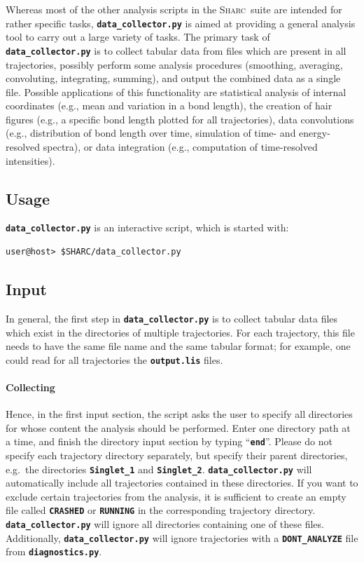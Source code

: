 \documentclass[a4paper,10pt,DIV=15,openany]{scrbook}
\newcommand{\sharc}{\textsc{Sharc}}
\newcommand{\ttt}[1]{\textbf{\texttt{#1}}}
\begin{document}
Whereas most of the other analysis scripts in the \sharc\ suite are intended for rather specific tasks, \ttt{data\_collector.py} is aimed at providing a general analysis tool to carry out a large variety of tasks.
The primary task of \ttt{data\_collector.py} is to collect tabular data from files which are present in all trajectories, possibly perform some analysis procedures (smoothing, averaging, convoluting, integrating, summing), and output the combined data as a single file.
Possible applications of this functionality are statistical analysis of internal coordinates (e.g., mean and variation in a bond length), the creation of hair figures (e.g., a specific bond length plotted for all trajectories), data convolutions (e.g., distribution of bond length over time, simulation of time- and energy-resolved spectra), or data integration (e.g., computation of time-resolved intensities).

\subsection{Usage}

\ttt{data\_collector.py} is an interactive script, which is started with:
\begin{verbatim}
user@host> $SHARC/data_collector.py
\end{verbatim}

\subsection{Input}

In general, the first step in \ttt{data\_collector.py} is to collect tabular data files which exist in the directories of multiple trajectories.
For each trajectory, this file needs to have the same file name and the same tabular format; for example, one could read for all trajectories the \ttt{output.lis} files.

\paragraph{Collecting}

Hence, in the first input section, the script asks the user to specify all directories for whose content the analysis should be performed. Enter one directory path at a time, and finish the directory input section by typing ``\ttt{end}''. Please do not specify each trajectory directory separately, but specify their parent directories, e.g.\ the directories \ttt{Singlet\_1} and \ttt{Singlet\_2}. \ttt{data\_collector.py} will automatically include all trajectories contained in these directories.
If you want to exclude certain trajectories from the analysis, it is sufficient to create an empty file called \ttt{CRASHED} or \ttt{RUNNING} in the corresponding trajectory directory. \ttt{data\_collector.py} will ignore all directories containing one of these files.
Additionally, \ttt{data\_collector.py} will ignore trajectories with a \ttt{DONT\_ANALYZE} file from \ttt{diagnostics.py}.
\end{document}
